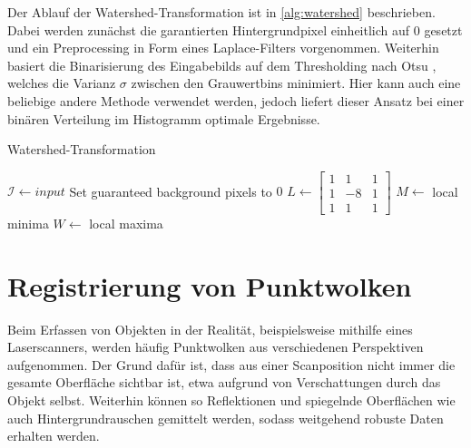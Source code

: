 Der Ablauf der Watershed-Transformation ist in \autoref{alg:watershed} beschrieben.
Dabei werden zunächst die garantierten Hintergrundpixel einheitlich auf 0 gesetzt und ein Preprocessing in Form eines Laplace-Filters vorgenommen.
Weiterhin basiert die Binarisierung des Eingabebilds auf dem Thresholding nach Otsu \cite{otsu1979threshold}, welches die Varianz $\sigma$ zwischen den Grauwertbins minimiert.
Hier kann auch eine beliebige andere Methode verwendet werden, jedoch liefert dieser Ansatz bei einer binären Verteilung im Histogramm optimale Ergebnisse.

\begin{algorithm}
\caption[Watershed-Transformation]{Watershed-Transformation \cite{openCVwatershed}}
\label{alg:watershed}
\begin{algorithmic}
\State $\mathcal{I} \gets input$
\State Set guaranteed background pixels to $0$
\State $L \gets \begin{bmatrix}1 & 1 & 1\\1 & -8 & 1\\1 & 1 & 1\end{bmatrix}$
\State {}
\State {}
\State {}
\State $M \gets$ local minima
\State $W \gets$ local maxima
\State {}
	\State {}
\EndFor
\end{algorithmic}
\end{algorithm}



\section{Registrierung von Punktwolken}
\label{sec:registration}

Beim Erfassen von Objekten in der Realität, beispielsweise mithilfe eines Laserscanners, werden häufig Punktwolken aus verschiedenen Perspektiven aufgenommen.
Der Grund dafür ist, dass aus einer Scanposition nicht immer die gesamte Oberfläche sichtbar ist, etwa aufgrund von Verschattungen durch das Objekt selbst.
Weiterhin können so Reflektionen und spiegelnde Oberflächen wie auch Hintergrundrauschen gemittelt werden, sodass weitgehend robuste Daten erhalten werden.

